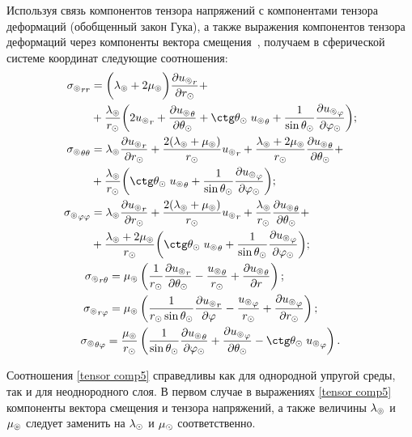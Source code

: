 Используя связь компонентов тензора напряжений с компонентами тензора деформаций (обобщенный закон Гука), а также выражения компонентов тензора деформаций через компоненты вектора смещения~\cite{Nowacki}, получаем в сферической системе координат следующие соотношения:
\begin{equation}\label{tensor comp}
    \begin{gathered}
    \begin{aligned}
        {\si\l}_{rr} &= \biggl(\la\l+2\mu\l\biggr)\fr{\de {u\l}_r}{\de r\s} +\\
        &+ \fr{\la\l} {r\s} \biggl(2{u\l}_r+\fr{\de {u\l}_\Q}{\de\Q\s}+\ctg\Q\s\;{u\l}_\Q + \fr{1}{\sin\Q\s}\fr{\de {u\l}_\f}{\de\f\s}\biggr);\\        
        {\si\l}_{\Q\Q} &= \la\l\fr{\de {u\l}_r}{\de r\s} + \fr{2(\la\l+\mu\l)}{r\s} {u\l}_r + \fr{\la\l+2\mu\l}{r\s} \fr{\de {u\l}_\Q}{\de\Q\s} +\\
         &+ \fr{\la\l}{r\s} \biggl(\ctg\Q\s \;{u\l}_\Q + \fr{1}{\sin\Q\s}\fr{\de {u\l}_\f}{\de\f\s}\biggr);\\
        {\si\l}_{\f\f} &= \la\l\fr{\de {u\l}_r}{\de r\s} + \fr{2(\la\l+\mu\l)}{r\s} {u\l}_r + \fr{\la\l}{r\s} \fr{\de {u\l}_\Q}{\de\Q\s} +\\
        &+ \fr{\la\l+2\mu\l}{r\s}\biggl(\ctg\Q\s \;{u\l}_\Q + \fr{1}{\sin\Q\s}\fr{\de {u\l}_\f}{\de\f\s}\biggr);\\
    \end{aligned}\\
    \begin{aligned}
        {\si\l}_{r\Q}=\mu\l&\left(\fr1{r\s} \fr{\de {u\l}_r}{\de\Q\s} - \fr{{u\l}_\Q}{r\s} + \fr{\de {u\l}_\Q}{\de r}\right);\\
        {\si\l}_{r\f}=\mu\l&\left(\fr1{r\s\sin\Q\s} \fr{\de {u\l}_r}{\de\f} - \fr{{u\l}_\f}{r\s} + \fr{\de {u\l}_\f}{\de r\s}\right);\\
        {\si\l}_{\Q\f}=\fr{\mu\l} {r\s}&\left(\fr1{\sin\Q\s} \fr{\de {u\l}_\Q}{\de\f\s} + \fr{\de {u\l}_\f}{\de\Q\s} - \ctg\Q\s \;{u\l}_\f \right).\\
    \end{aligned}
    \end{gathered}
\end{equation}

Соотношения \eqref{tensor comp5} справедливы как для однородной упругой среды, так и для неоднородного слоя. В первом случае в выражениях \eqref{tensor comp5} компоненты вектора смещения и тензора напряжений, а также величины $\lambda_\circledcirc$ и $\mu_\circledcirc$ следует заменить на $\lambda_\odot$ и $\mu_\odot$ соответственно.

